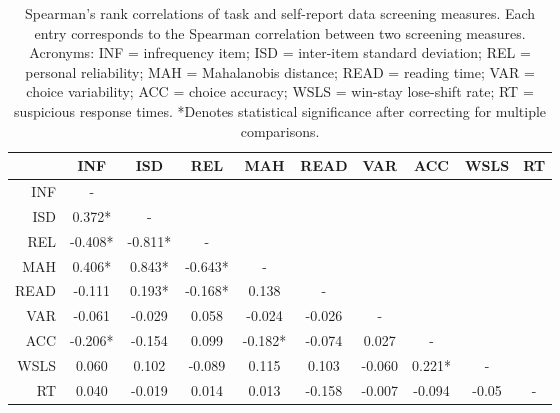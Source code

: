 \documentclass[a4paper,notitlepage,12pt]{article}
\begin{document}
\begin{refsection}[supp]
\begin{table}[H]
\centering
\small
\begin{tabular}{rccccccccc}
\toprule
{} &      INF &      ISD &      REL &      MAH &    READ &     VAR &     ACC &   WSLS & RT \\
\midrule
INF  &        - &          &          &          &         &         &         &        &    \\
ISD  &   0.372* &        - &          &          &         &         &         &        &    \\
REL  &  -0.408* &  -0.811* &        - &          &         &         &         &        &    \\
MAH  &   0.406* &   0.843* &  -0.643* &        - &         &         &         &        &    \\
READ &   -0.111 &   0.193* &  -0.168* &    0.138 &       - &         &         &        &    \\
VAR  &   -0.061 &   -0.029 &    0.058 &   -0.024 &  -0.026 &       - &         &        &    \\
ACC  &  -0.206* &   -0.154 &    0.099 &  -0.182* &  -0.074 &   0.027 &       - &        &    \\
WSLS &    0.060 &    0.102 &   -0.089 &    0.115 &   0.103 &  -0.060 &  0.221* &      - &    \\
RT   &    0.040 &   -0.019 &    0.014 &    0.013 &  -0.158 &  -0.007 &  -0.094 &  -0.05 &  - \\
\bottomrule
\end{tabular}
\captionsetup{width=0.88\textwidth}
\caption{Spearman's rank correlations of task and self-report data screening measures. Each entry corresponds to the Spearman correlation between two screening measures. Acronyms: INF = infrequency item; ISD = inter-item standard deviation; REL = personal reliability; MAH = Mahalanobis distance; READ = reading time; VAR = choice variability; ACC = choice accuracy; WSLS = win-stay lose-shift rate; RT = suspicious response times. *Denotes statistical significance after correcting for multiple comparisons.}
\end{table}


\end{refsection}
\end{document}
